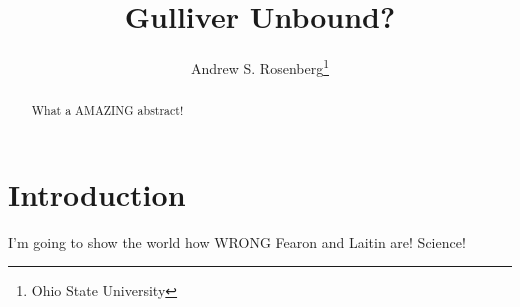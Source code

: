 \documentclass[12pt]{article}\usepackage[]{graphicx}\usepackage[]{color}
\begin{document}
\title{Gulliver Unbound?}

\author{Andrew S. Rosenberg\thanks{Ohio State University}}

\maketitle

\begin{abstract} \noindent
What a AMAZING abstract!
\end{abstract}

\thispagestyle{empty}

\newpage
\setcounter{page}{1}
\doublespacing

\section*{Introduction}
I'm going to show the world how WRONG Fearon and Laitin are! Science!
\end{document}
